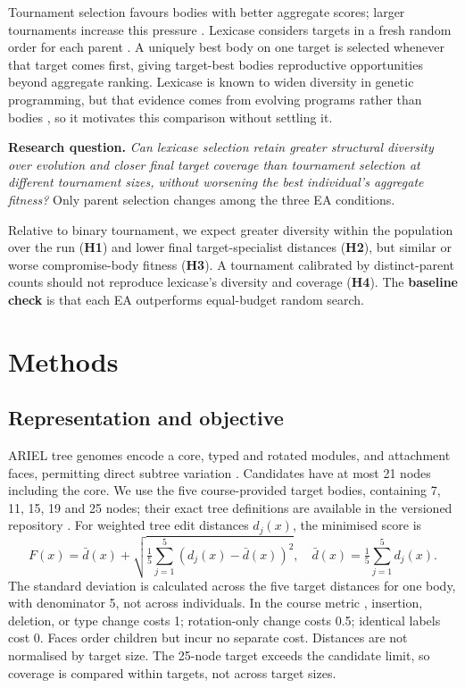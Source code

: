 \documentclass[sigconf]{acmart}
\newcommand{\researchquestion}{Can lexicase selection retain greater structural diversity over evolution and closer final target coverage than tournament selection at different tournament sizes, without worsening the best individual's aggregate fitness?}
\begin{document}
Tournament selection favours bodies with better aggregate scores; larger tournaments increase this pressure \cite{eiben2015}. Lexicase considers targets in a fresh random order for each parent \cite{spector2012,helmuth2015}. A uniquely best body on one target is selected whenever that target comes first, giving target-best bodies reproductive opportunities beyond aggregate ranking. Lexicase is known to widen diversity in genetic programming, but that evidence comes from evolving programs rather than bodies \cite{helmuth2016diversity}, so it motivates this comparison without settling it.

\textbf{Research question.} \emph{\researchquestion} Only parent selection changes among the three EA conditions.

Relative to binary tournament, we expect greater diversity within the population over the run (\textbf{H1}) and lower final target-specialist distances (\textbf{H2}), but similar or worse compromise-body fitness (\textbf{H3}). A tournament calibrated by distinct-parent counts should not reproduce lexicase's diversity and coverage (\textbf{H4}). The \textbf{baseline check} is that each EA outperforms equal-budget random search.

\section{Methods}
\subsection{Representation and objective}
ARIEL tree genomes encode a core, typed and rotated modules, and attachment faces, permitting direct subtree variation \cite{ariel2026}. Candidates have at most 21 nodes including the core. We use the five
course-provided target bodies, containing 7, 11, 15, 19 and 25 nodes;
their exact tree definitions are available in the versioned repository
\cite{assignment2026,group44}. For weighted tree edit distances $d_j(x)$, the minimised score is
\begin{equation}
F(x)=\bar d(x)+\sqrt{\tfrac{1}{5}\sum_{j=1}^{5}(d_j(x)-\bar d(x))^2},
\quad \bar d(x)=\tfrac{1}{5}\sum_{j=1}^{5}d_j(x).
\label{eq:fitness}
\end{equation}
The standard deviation is calculated across the five target distances for one body, with denominator 5, not across individuals. In the course metric \cite{assignment2026,zhang1989}, insertion, deletion, or type change costs 1; rotation-only change costs 0.5; identical labels cost 0. Faces order children but incur no separate cost. Distances are not normalised by target size. The 25-node target exceeds the candidate limit, so coverage is compared within targets, not across target sizes.
\end{document}
